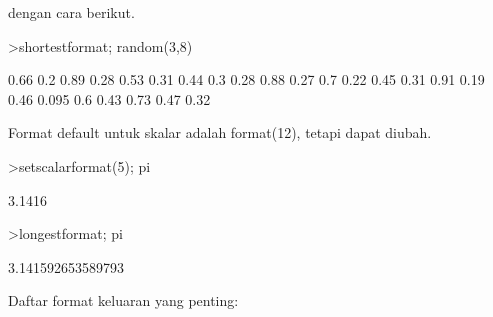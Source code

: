 \documentclass[a4paper,10pt]{article}
\begin{document}
\begin{eulernotebook}
\begin{eulercomment}
dengan cara berikut.
\end{eulercomment}
\begin{eulerprompt}
>shortestformat; random(3,8)
\end{eulerprompt}
\begin{euleroutput}
    0.66    0.2   0.89   0.28   0.53   0.31   0.44    0.3 
    0.28   0.88   0.27    0.7   0.22   0.45   0.31   0.91 
    0.19   0.46  0.095    0.6   0.43   0.73   0.47   0.32 
\end{euleroutput}
\begin{eulercomment}
Format default untuk skalar adalah format(12), tetapi dapat diubah.
\end{eulercomment}
\begin{eulerprompt}
>setscalarformat(5); pi
\end{eulerprompt}
\begin{euleroutput}
  3.1416
\end{euleroutput}
\begin{eulerprompt}
>longestformat; pi
\end{eulerprompt}
\begin{euleroutput}
  3.141592653589793
\end{euleroutput}
\begin{eulercomment}
Daftar format keluaran yang penting:


\end{eulercomment}
\end{eulernotebook}
\end{document}
